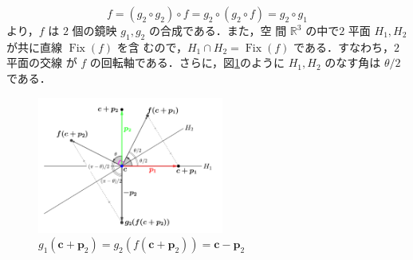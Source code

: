 \documentclass[11pt, uplatex, dvipdfmx, titlepage]{jsarticle}
\makeatletter
\DeclareMathOperator{\Fix}{Fix}
\renewenvironment{proof}[1][\proofname]{\par
  \pushQED{\qed}%
  \normalfont \topsep6\p@\@plus6\p@\relax
  \trivlist
  \item[\hskip\labelsep
         \bfseries
    {#1}]\ignorespaces
}{%
  \popQED\endtrivlist\@endpefalse
}
\theoremstyle{definition}
\renewcommand{\proofname}{\textbf{証明}}
\makeatother
\begin{document}
\begin{proof}
  \[
    f = (g_2 \circ g_2) \circ f = g_2 \circ (g_2 \circ f) = g_2 \circ g_1
  \]
  より，$f$ は $2$ 個の鏡映 $g_1, g_2$ の合成である．また，空
  間 $\mathbb{R}^3$ の中で$2$ 平面 $H_1, H_2$ が共に直線 $\Fix(f)$ を含
  むので，$H_1 \cap H_2 = \Fix(f)$ である．すなわち，$2$ 平面の交線
  が $f$ の回転軸である．さらに，図\ref{fig:cutplane3}のように $H_1,
  H_2$ のなす角は $\theta/2$ である．
  \begin{figure}[h]
    \centering
    \includegraphics[height=4.5cm]{pictures/cutplane3.pdf}
    \caption{$g_1(\bm{c}+\bm{p}_2) = g_2\left( f(\bm{c}+\bm{p}_2)\right) = \bm{c}-\bm{p}_2$}\label{fig:cutplane3}
  \end{figure}

 
  
  


  

\end{proof}
\end{document}
